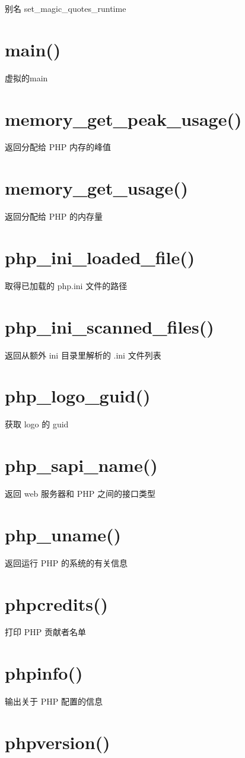 别名 set\_magic\_quotes\_runtime
\section{main()}

虚拟的main
\section{memory\_get\_peak\_usage()}

返回分配给 PHP 内存的峰值
\section{memory\_get\_usage()}

返回分配给 PHP 的内存量
\section{php\_ini\_loaded\_file()}

取得已加载的 php.ini 文件的路径
\section{php\_ini\_scanned\_files()}

返回从额外 ini 目录里解析的 .ini 文件列表
\section{php\_logo\_guid()}

获取 logo 的 guid
\section{php\_sapi\_name()}

返回 web 服务器和 PHP 之间的接口类型
\section{php\_uname()}

返回运行 PHP 的系统的有关信息
\section{phpcredits()}

打印 PHP 贡献者名单
\section{phpinfo()}

输出关于 PHP 配置的信息
\section{phpversion()}

